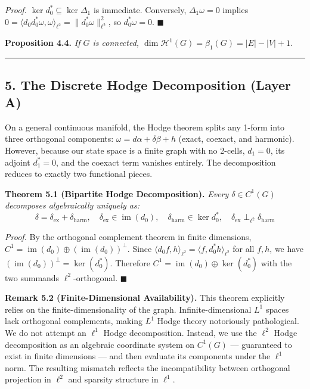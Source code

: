 \documentclass[
]{article}
\begin{document}
\emph{Proof.} \(\ker d_0^* \subseteq \ker \Delta_1\) is immediate.
Conversely, \(\Delta_1 \omega = 0\) implies
\(0 = \langle d_0 d_0^* \omega, \omega \rangle_{\ell^2} = \|d_0^* \omega\|_{\ell^2}^2\),
so \(d_0^* \omega = 0\). \(\blacksquare\)

\textbf{Proposition 4.4.} \emph{If \(G\) is connected,
\(\dim \mathcal{H}^1(G) = \beta_1(G) = |E| - |V| + 1\).}

\begin{center}\rule{0.5\linewidth}{0.5pt}\end{center}

\subsection{\texorpdfstring{5. The Discrete Hodge Decomposition
\textbf{(Layer
A)}}{5. The Discrete Hodge Decomposition (Layer A)}}\label{the-discrete-hodge-decomposition-layer-a}

On a general continuous manifold, the Hodge theorem splits any 1-form
into three orthogonal components:
\(\omega = d\alpha + \delta \beta + h\) (exact, coexact, and harmonic).
However, because our state space is a finite graph with no 2-cells,
\(d_1 = 0\), its adjoint \(d_1^* = 0\), and the coexact term vanishes
entirely. The decomposition reduces to exactly two functional pieces.

\textbf{Theorem 5.1 (Bipartite Hodge Decomposition).} \emph{Every
\(\delta \in C^1(G)\) decomposes algebraically uniquely as:}
\[ \delta = \delta_{\text{ex}} + \delta_{\text{harm}}, \quad \delta_{\text{ex}} \in \operatorname{im}(d_0), \quad \delta_{\text{harm}} \in \ker d_0^*, \quad \delta_{\text{ex}} \perp_{\ell^2} \delta_{\text{harm}} \]

\emph{Proof.} By the orthogonal complement theorem in finite dimensions,
\(C^1 = \operatorname{im}(d_0) \oplus (\operatorname{im}(d_0))^\perp\).
Since
\(\langle d_0 f, h \rangle_{\ell^2} = \langle f, d_0^* h \rangle_{\ell^2}\)
for all \(f, h\), we have
\((\operatorname{im}(d_0))^\perp = \ker(d_0^*)\). Therefore
\(C^1 = \operatorname{im}(d_0) \oplus \ker(d_0^*)\) with the two
summands \(\ell^2\)-orthogonal. \(\blacksquare\)

\textbf{Remark 5.2 (Finite-Dimensional Availability).} This theorem
explicitly relies on the finite-dimensionality of the graph.
Infinite-dimensional \(L^1\) spaces lack orthogonal complements, making
\(L^1\) Hodge theory notoriously pathological. We do not attempt an
\(\ell^1\) Hodge decomposition. Instead, we use the \(\ell^2\) Hodge
decomposition as an algebraic coordinate system on \(C^1(G)\) ---
guaranteed to exist in finite dimensions --- and then evaluate its
components under the \(\ell^1\) norm. The resulting mismatch reflects
the incompatibility between orthogonal projection in \(\ell^2\) and
sparsity structure in \(\ell^1\).
\end{document}
